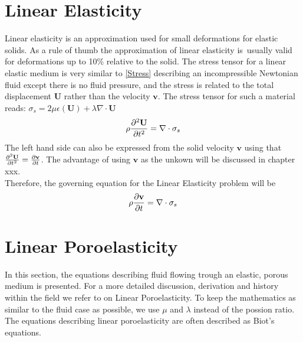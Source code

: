 \section{Linear Elasticity}
Linear elasticity is an approximation used for small deformations for elastic solids. As a rule of thumb the approximation of linear elasticity is usually valid for deformations up to 10\% relative to the solid. The stress tensor for a linear elastic medium is very similar to \eqref{Stress} describing an incompressible Newtonian fluid except there is no fluid pressure, and the stress is related to the total displacement $\mathbf{U}$ rather than the velocity $\mathbf{v}$. The stress tensor for such a material reads:
$\sigma_s = 2\mu\epsilon(\mathbf{U}) + \lambda \nabla \cdot \mathbf{U}$
\begin{align} 
\rho \frac{\partial ^2\mathbf{U}}{\partial t^2} = \nabla \cdot \sigma_s \label{LE}
\end{align}
The left hand side can also be expressed from the solid velocity $\mathbf{v}$ using that $\frac{\partial ^2\mathbf{U}}{\partial t^2} = \frac{\partial \mathbf{v}}{\partial t} $. The advantage of using $\mathbf{v}$ as the unkown will be discussed in chapter xxx.
\\
Therefore, the governing equation for the Linear Elasticity problem will be
\begin{align}
\rho \frac{\partial \mathbf{v}}{\partial t} = \nabla \cdot \sigma_s \label{LE2}
\end{align}
\section{Linear Poroelasticity}
In this section, the equations describing fluid flowing trough an elastic, porous medium is presented. For a more detailed discussion, derivation and history within the field we refer to \cite{Wang00} on Linear Poroelasticity. To keep the mathematics as similar to the fluid case as possible, we use $\mu$ and $\lambda$ instead of the possion ratio. The equations describing linear poroelasticity are often described as Biot's equations. 
\\
\\
